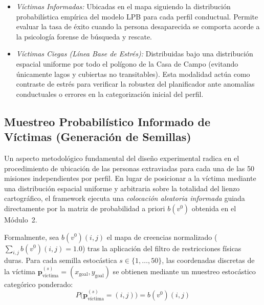 \begin{itemize}
    \begin{itemize}
        \item \textit{Víctimas Informadas:} Ubicadas en el mapa siguiendo la distribución probabilística empírica del modelo LPB para cada perfil conductual. Permite evaluar la tasa de éxito cuando la persona desaparecida se comporta acorde a la psicología forense de búsqueda y rescate.
        \item \textit{Víctimas Ciegas (Línea Base de Estrés):} Distribuidas bajo una distribución espacial uniforme por todo el polígono de la Casa de Campo (evitando únicamente lagos y cubiertas no transitables). Esta modalidad actúa como contraste de estrés para verificar la robustez del planificador ante anomalías conductuales o errores en la categorización inicial del perfil.
    \end{itemize}
\end{itemize}

\subsection{Muestreo Probabilístico Informado de Víctimas (Generación de Semillas)}

Un aspecto metodológico fundamental del diseño experimental radica en el procedimiento de ubicación de las personas extraviadas para cada una de las 50 misiones independientes por perfil. En lugar de posicionar a la víctima mediante una distribución espacial uniforme y arbitraria sobre la totalidad del lienzo cartográfico, el framework ejecuta una \textit{colocación aleatoria informada} guiada directamente por la matriz de probabilidad a priori $b(v^0)$ obtenida en el Módulo~2.

Formalmente, sea $b(v^0)(i, j)$ el mapa de creencias normalizado ($\sum_{i,j} b(v^0)(i,j) = 1.0$) tras la aplicación del filtro de restricciones físicas duras. Para cada semilla estocástica $s \in \{1, \dots, 50\}$, las coordenadas discretas de la víctima $\mathbf{p}_{\text{víctima}}^{(s)} = (x_{\text{goal}}, y_{\text{goal}})$ se obtienen mediante un muestreo estocástico categórico ponderado:
\begin{equation}
    P\Big(\mathbf{p}_{\text{víctima}}^{(s)} = (i, j)\Big) = b(v^0)(i, j)
\end{equation}


